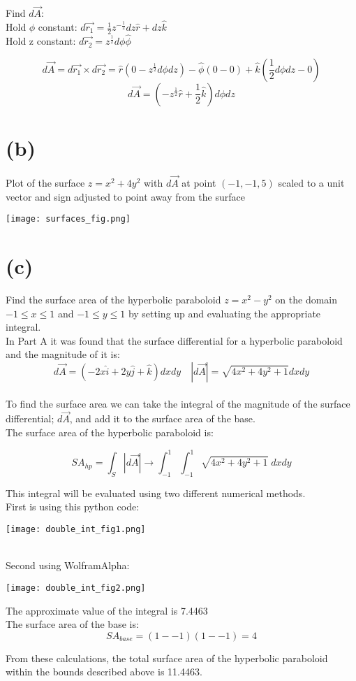 \documentclass[11pt]{article}
\begin{document}
Find $d\vec{A}$:
\\
Hold $\phi$ constant:
$d\vec{r_1} = \frac{1}{2}z^{-\frac{1}{2}}dz\hat{r}+dz\hat{k}$
\\
Hold z constant:
$d\vec{r_2} =z^\frac{1}{2}d\phi\hat{\phi}$

$$d\vec{A} = d\vec{r_1} \times d\vec{r_2} = \hat{r}(0-z^\frac{1}{2}d\phi dz) - \hat{\phi}(0-0)+\hat{k}(\frac{1}{2}d\phi dz-0)$$
$$d\vec{A} = (-z^\frac{1}{2}\hat{r}+\frac{1}{2}\hat{k})d\phi dz$$

\section*{(b)}
Plot of the surface $z=x^2+4y^2$ with $d\vec{A}$ at point $(-1,-1,5)$ scaled to a unit vector and sign adjusted to point away from the surface
\begin{center}
    \texttt{[image: surfaces\_fig.png]}
\end{center}


\section*{(c)}
Find the surface area of the hyperbolic paraboloid $z=x^2-y^2$ on the domain $-1 \leq x \leq 1$ and $-1 \leq y \leq 1$ by setting up and evaluating the appropriate integral.
\\
In Part A it was found that the surface differential for a hyperbolic paraboloid and the magnitude of it is:
$$d\vec{A} = (-2x\hat{i}+2y\hat{j}+\hat{k})dxdy \quad |d\vec{A}| =\sqrt{4x^2+4y^2+1}dxdy$$
\\
To find the surface area we can take the integral of the magnitude of the surface differential; $d\vec{A}$, and add it to the surface area of the base.
\\
The surface area of the hyperbolic paraboloid is:

$$SA_{hp} = \int_S |d\vec{A}| \rightarrow \int_{-1}^1\int_{-1}^1 \sqrt{4x^2+4y^2+1}\; dxdy$$

This integral will be evaluated using two different numerical methods.
\\

First is using this python code:
\begin{center}
    \texttt{[image: double\_int\_fig1.png]}
\end{center}
\\

Second using WolframAlpha:
\begin{center}
    \texttt{[image: double\_int\_fig2.png]}
\end{center}

The approximate value of the integral is 7.4463
\\

The surface area of the base is:
$$SA_{base} = (1 - -1)(1 - -1) = 4$$

From these calculations, the total surface area of the hyperbolic paraboloid within the bounds described above is 11.4463.
\end{document}
